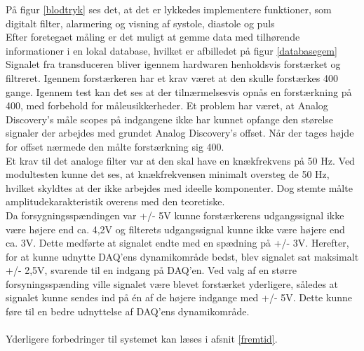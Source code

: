 På figur \ref{blodtryk} ses det, at det er lykkedes implementere funktioner, som digitalt filter, alarmering og visning af systole, diastole og puls\\
Efter foretegaet måling er det muligt at gemme data med tilhørende informationer i en lokal database, hvilket er afbilledet på figur \ref{databasegem}
Signalet fra transduceren bliver igennem hardwaren henholdsvis forstærket og filtreret. Igennem forstærkeren har et krav været at den skulle forstærkes 400 gange. Igennem test kan det ses at der tilnærmelsesvis opnås en forstærkning på 400, med forbehold for måleusikkerheder. Et problem har været, at Analog Discovery’s måle scopes på indgangene ikke har kunnet opfange den størelse signaler der arbejdes med grundet Analog Discovery’s offset. Når der tages højde for offset nærmede den målte forstærkning sig 400. \\
Et krav til det analoge filter var at den skal have en knækfrekvens på 50 Hz. Ved modultesten kunne det ses, at knækfrekvensen minimalt oversteg de 50 Hz, hvilket skyldtes at der ikke arbejdes med ideelle komponenter. Dog stemte målte amplitudekarakteristik overens med den teoretiske. \\
Da forsygningsspændingen var +/- 5V kunne forstærkerens udgangssignal ikke være højere end ca. 4,2V og filterets udgangssignal kunne ikke være højere end ca. 3V. Dette medførte at signalet endte med en spædning på +/- 3V. Herefter, for at kunne udnytte DAQ’ens dynamikområde bedst, blev signalet sat maksimalt +/- 2,5V, svarende til en indgang på DAQ’en. Ved valg af en større forsyningsspænding ville signalet være blevet forstærket yderligere, således at signalet kunne sendes ind på én af de højere indgange med +/- 5V. Dette kunne føre til en bedre udnyttelse af DAQ'ens dynamikområde.\\
\\
Yderligere forbedringer til systemet kan læses i afsnit \ref{fremtid}.
